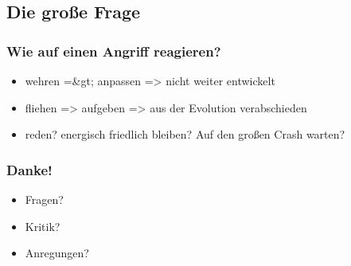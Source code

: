 \documentclass{beamer}
\begin{document}
\subsection{Die große Frage}
\frame
{
  \frametitle{Wie auf einen Angriff reagieren?}
  
  \begin{itemize}[<+->]
  \item wehren =&gt; anpassen => nicht weiter entwickelt
  \item fliehen => aufgeben => aus der Evolution verabschieden
  \item reden? energisch friedlich bleiben? Auf den großen Crash warten?
  \end{itemize}

}
\frame
{
  \frametitle{Danke!}
  
  \begin{itemize}
  \item Fragen?
  \item Kritik?
  \item Anregungen?
  \end{itemize}

}
\end{document}
